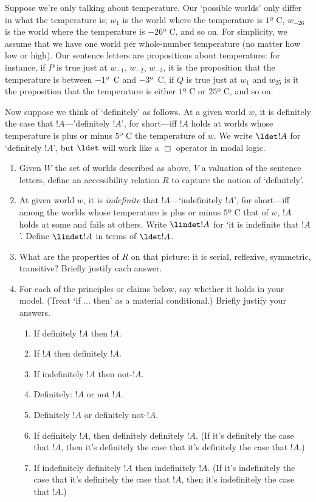 \documentclass[../../../../include/open-logic-section]{subfiles}
\begin{document}
\begin{prob}
Suppose we're only talking about temperature. Our `possible worlds'
only differ in what the temperature is; $w_{1}$ is the world where
the temperature is $1$º C, $w_{-26}$ is the world where the temperature
is $-26$º C, and so on. For simplicity, we assume that we have one
world per whole-number temperature (no matter how low or high). Our
sentence letters are propositions about temperature: for instance,
if $P$ is true just at $w_{-1}$, $w_{-2}$, $w_{-3}$, it is the
proposition that the temperature is between $-1$º~C and $-3$º~C,
if $Q$ is true just at $w_{1}$ and $w_{25}$ is it the proposition
that the temperature is either $1$º C or $25$º C, and so on. 

Now suppose we think of `definitely' as follows. At a given world
$w$, it is definitely the case that $!A$---'definitely $!A$',
for short---iff $!A$ holds at worlds whose temperature is plus
or minus $5$º C the temperature of $w$. We write $\ldet!A$
for `definitely $!A$', but $\ldet$ will work like a $\Box$
operator in modal logic. 

\begin{enumerate}
\item Given $W$ the set of worlds described as above, $V$ a valuation
of the sentence letters, define an accessibility relation $R$ to
capture the notion of `definitely'. 
\item At given world $w$, it is \emph{indefinite} that $!A$---`indefinitely
$!A$', for short---iff among the worlds whose temperature is plus
or minus $5$º C that of $w$, $!A$ holds at some and fails at
others. Write $\lindet!A$ for `it is indefinite that $!A$'.
Define $\lindet!A$ in terms of $\ldet!A$.
\item What are the properties of $R$ on that picture: it is serial, reflexive,
symmetric, transitive? Briefly justify each answer. 
\item For each of the principles or claims below, say whether it holds in
your model. (Treat `if $\ldots$ then' as a material conditional.)
Briefly justify your answers.
	\begin{enumerate}
		\item If definitely $!A$ then $!A$.
		\item If $!A$ then definitely $!A$.
		\item If indefinitely $!A$ then not-$!A$.
		\item Definitely: $!A$ or not $!A$.
		\item Definitely $!A$ or definitely not-$!A$.
		\item If definitely $!A$, then definitely definitely $!A$. (If it's
		definitely the case that $!A$, then it's definitely the case that
		it's definitely the case that $!A$.)
		\item If indefinitely definitely $!A$ then indefinitely $!A$. (If
		it's indefinitely the case that it's definitely the case that $!A$,
		then it's indefinitely the case that $!A$.)
	\end{enumerate}
\end{enumerate}

\end{prob}
\end{document}

